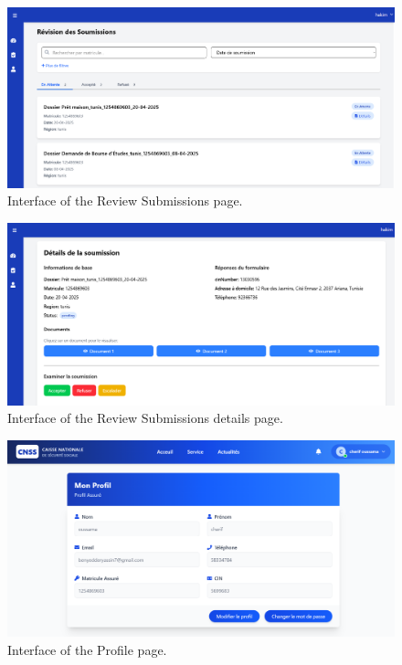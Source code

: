 \begin{figure}[h!]
    \centering
    \includegraphics[width=1\textwidth]{figures/ui-reviewsub.png}
    \caption{Interface of the Review Submissions page.}
\end{figure}
\begin{figure}[h!]
    \centering
    \includegraphics[width=1\textwidth]{figures/ui-reviewsubdetails.png}
    \caption{Interface of the Review Submissions details page.}
\end{figure}
\begin{figure}[h!]
    \centering
    \includegraphics[width=1\textwidth]{figures/ui-profile.png}
    \caption{Interface of the Profile page.}
\end{figure}
